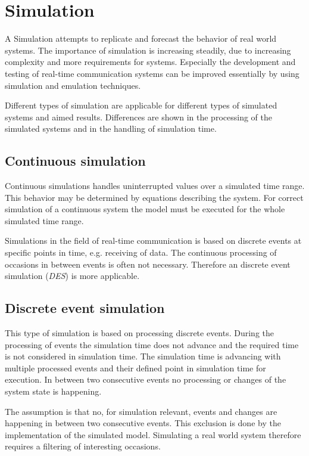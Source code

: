 \chapter{Simulation}
\label{cha:simulation}

A Simulation attempts to replicate and forecast the behavior of real world systems.
The importance of simulation is increasing steadily, due to increasing complexity and more requirements for systems.
Especially the development and testing of real-time communication systems can be improved essentially by using simulation and emulation techniques.

Different types of simulation are applicable for different types of simulated systems and aimed results.
Differences are shown in the processing of the simulated systems and in the handling of simulation time.
\cite[section 1.2]{mchaney2009understanding}

\section{Continuous simulation}
\label{sec:simulation_cont}
Continuous simulations handles uninterrupted values over a simulated time range.
This behavior may be determined by equations describing the system.
For correct simulation of a continuous system the model must be executed for the whole simulated time range. \cite[section 1.2.1]{mchaney2009understanding}

Simulations in the field of real-time communication is based on discrete events at specific points in time, e.g. receiving of data.
The continuous processing of occasions in between events is often not necessary.
Therefore an discrete event simulation (\emph{DES}) is more applicable.

\section{Discrete event simulation}
\label{sec:simulation_event}
This type of simulation is based on processing discrete events.
During the processing of events the simulation time does not advance and the required time is not considered in simulation time.
The simulation time is advancing with multiple processed events and their defined point in simulation time for execution.
In between two consecutive events no processing or changes of the system state is happening. \cite[chapter 1]{matloff_introduction_2008}

The assumption is that no, for simulation relevant, events and changes are happening in between two consecutive events.
This exclusion is done by the implementation of the simulated model.
Simulating a real world system therefore requires a filtering of interesting occasions. \cite[section 4.1.1]{omnet_manual}

